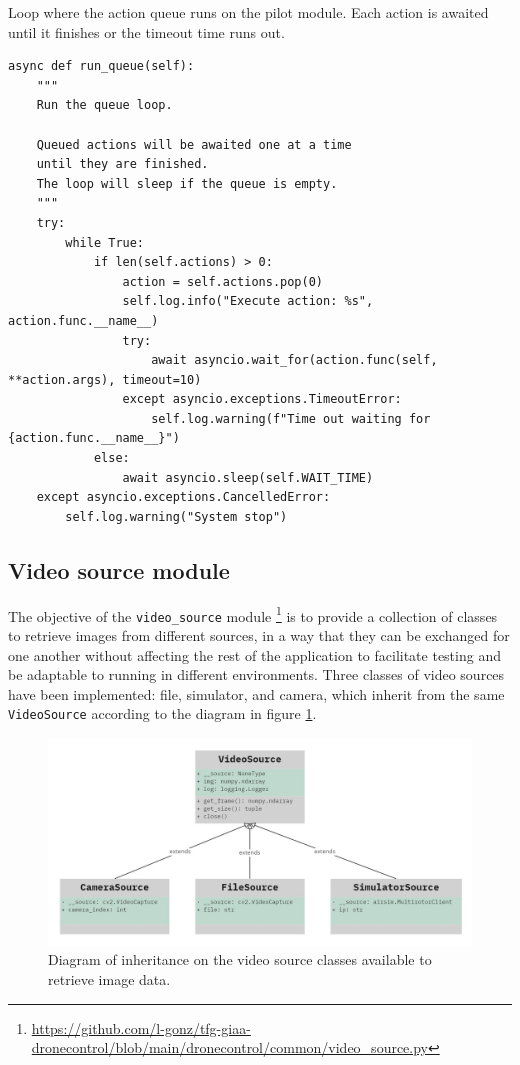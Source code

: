 \begin{listing}[h!]
    \caption{Loop where the action queue runs on the pilot module. Each action is awaited until it finishes or the timeout time runs out.}{}
    \label{lst:pilot-queue}
    \begin{verbatim}
async def run_queue(self):
    """
    Run the queue loop.
    
    Queued actions will be awaited one at a time
    until they are finished.
    The loop will sleep if the queue is empty.
    """
    try:
        while True:
            if len(self.actions) > 0:
                action = self.actions.pop(0)
                self.log.info("Execute action: %s", action.func.__name__)
                try:
                    await asyncio.wait_for(action.func(self, **action.args), timeout=10)
                except asyncio.exceptions.TimeoutError:
                    self.log.warning(f"Time out waiting for {action.func.__name__}")
            else:
                await asyncio.sleep(self.WAIT_TIME)
    except asyncio.exceptions.CancelledError:
        self.log.warning("System stop")
    \end{verbatim}
\end{listing}


\subsection{Video source module}
\label{subsec:viz-source-module}

The objective of the \texttt{video\_source} module \footnote{\url{https://github.com/l-gonz/tfg-giaa-dronecontrol/blob/main/dronecontrol/common/video_source.py}} is to provide a collection of classes to retrieve images from different sources,
in a way that they can be exchanged for one another without affecting the rest of the application to facilitate testing and be adaptable to running in different environments.
Three classes of video sources have been implemented: file, simulator, and camera, which inherit from the same \texttt{VideoSource} according to the diagram in figure \ref{fig:video-source-inheritance}.

\begin{figure}
  \centering
  \includegraphics[width=\textwidth, keepaspectratio]{img/uml-video-source.jpg}
  \caption{Diagram of inheritance on the video source classes available to retrieve image data.}
  \label{fig:video-source-inheritance}
\end{figure}

